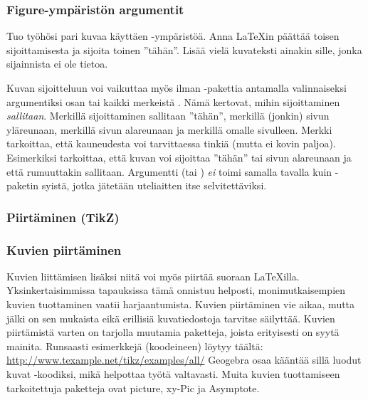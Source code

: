 \begin{fframe}
    \frametitle{Figure-ympäristön argumentit}
    \begin{harj}
        Tuo työhösi pari kuvaa käyttäen -ympäristöä. Anna \LaTeX{}in päättää toisen sijoittamisesta ja sijoita toinen ''tähän''. Lisää vielä kuvateksti ainakin sille, jonka sijainnista ei ole tietoa.
    \end{harj}
    \begin{extra}
        Kuvan sijoitteluun voi vaikuttaa myös ilman -pakettia antamalla valinnaiseksi argumentiksi osan tai kaikki merkeistä . Nämä kertovat, mihin sijoittaminen \emph{sallitaan}. Merkillä  sijoittaminen sallitaan ''tähän'', merkillä  (jonkin) sivun yläreunaan, merkillä  sivun alareunaan ja merkillä  omalle sivulleen. Merkki \cns{!} tarkoittaa, että kauneudesta voi tarvittaessa tinkiä (mutta ei kovin paljoa).
        \vaihto
        Esimerkiksi  tarkoittaa, että kuvan voi sijoittaa ''tähän'' tai sivun alareunaan ja että rumuuttakin sallitaan. Argumentti  (tai ) \emph{ei} toimi samalla tavalla kuin -paketin  syistä, jotka jätetään uteliaitten itse selvitettäviksi.
    \end{extra}
\end{fframe}

\subsubsection{Piirtäminen (TikZ)}
\begin{fframe}
    \frametitle{Kuvien piirtäminen}
    Kuvien liittämisen lisäksi niitä voi myös piirtää suoraan \LaTeX illa. Yksinkertaisimmissa tapauksissa tämä onnistuu helposti, monimutkaisempien kuvien tuottaminen vaatii harjaantumista.
    \vaihto
    Kuvien piirtäminen vie aikaa, mutta jälki on sen mukaista eikä erillisiä kuvatiedostoja tarvitse säilyttää.
    \pause
    \vaihto Kuvien piirtämistä varten on tarjolla muutamia paketteja, joista erityisesti \TikZ{} on syytä mainita. Runsaasti esimerkkejä (koodeineen) löytyy täältä: \url{http://www.texample.net/tikz/examples/all/}
    \pause
    \vaihto Geogebra osaa kääntää sillä luodut kuvat \TikZ-koodiksi, mikä helpottaa työtä valtavasti.
    \pause
    \vaihto Muita kuvien tuottamiseen tarkoitettuja paketteja ovat picture, xy-Pic ja Asymptote.
\end{fframe}

